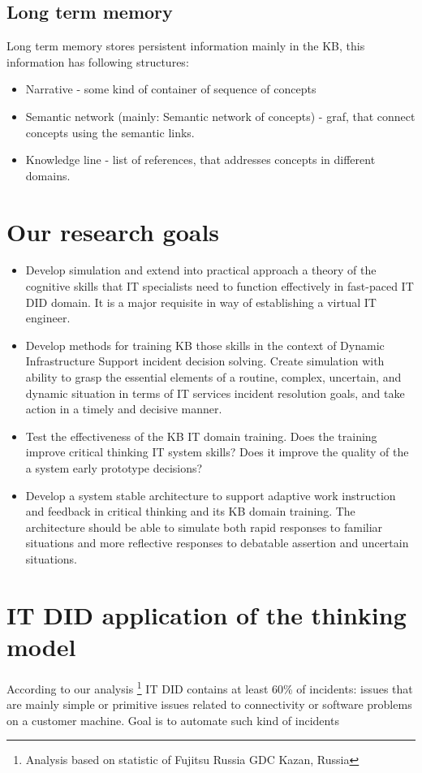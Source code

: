 \documentclass[conference]{IEEEtran}
\begin{document}
\subsection{Long term memory}
Long term memory stores persistent information mainly in the KB, this information has following structures:

\begin{itemize}
  \item Narrative - some kind of container of sequence of concepts
  \item Semantic network (mainly: Semantic network of concepts) - graf, that connect concepts using the semantic links.
  \item Knowledge line - list of references, that addresses concepts in different domains.
\end{itemize}

\section{Our research goals}
\begin{itemize}
 \item  Develop simulation and extend into practical approach a theory of the cognitive skills that IT specialists need to function effectively in fast-paced IT DID domain. It is a major requisite in way of establishing  a virtual IT engineer.
\item  Develop methods for training KB those skills in the context of Dynamic Infrastructure Support incident decision solving. Create simulation with ability to grasp the essential elements of a routine, complex, uncertain, and dynamic situation in terms of IT services incident resolution goals, and take action in a timely and decisive manner.
\item Test the effectiveness of the KB IT domain training. Does the training improve critical thinking IT system skills? Does it improve the quality of the a system early prototype decisions?
\item Develop a system stable architecture to support adaptive work instruction and feedback in critical thinking and its KB domain training. The architecture should be able to simulate both rapid responses to familiar situations and more reflective responses to debatable assertion and  uncertain situations.
\end{itemize}

\section{IT DID application of the thinking model}
According to our analysis \footnote{Analysis based on statistic of Fujitsu Russia GDC Kazan, Russia } IT DID contains at least 60\% of incidents: issues that are mainly simple or primitive issues related to connectivity or software problems on a customer machine. Goal is to automate such kind of incidents
\end{document}
